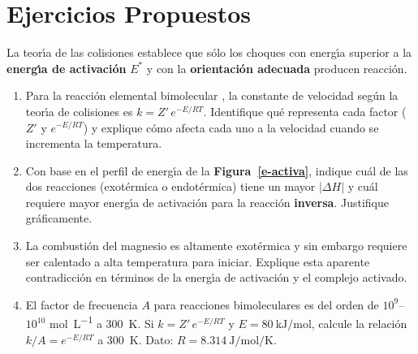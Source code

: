 
\section*{Ejercicios Propuestos}
\label{sec:ejercicios_cap03}

\begin{bloque_ejercicios}

\begin{ejercicios}

\item La teor\'{\i}a de las colisiones establece que s\'olo los choques
con energ\'{\i}a superior a la \textbf{energ\'{\i}a de activaci\'on} $E^*$ y
con la \textbf{orientaci\'on adecuada} producen reacci\'on.

\begin{enumerate}[label=\alph*)]
    \item Para la reacci\'on elemental bimolecular
          , la constante de velocidad
          seg\'un la teor\'{\i}a de colisiones es $k = Z'\,e^{-E/RT}$.
          Identifique qu\'e representa cada factor ($Z'$ y $e^{-E/RT}$)
          y explique c\'omo afecta cada uno a la velocidad cuando se
          incrementa la temperatura.

    \item Con base en el perfil de energ\'{\i}a de la
          \textbf{Figura~\ref{e-activa}}, indique cu\'al de las
          dos reacciones (exot\'ermica o endot\'ermica) tiene un
          mayor $|\Delta H|$ y cu\'al requiere mayor energ\'{\i}a de
          activaci\'on para la reacci\'on \textbf{inversa}.
          Justifique gr\'aficamente.

    \item La combusti\'on del magnesio es altamente exot\'ermica y
          sin embargo requiere ser calentado a alta temperatura para
          iniciar. Explique esta aparente contradicci\'on en t\'erminos
          de la energ\'{\i}a de activaci\'on y el complejo activado.

    \item El factor de frecuencia $A$ para reacciones bimoleculares
          es del orden de $10^9$--$10^{10}$ \si{\mole\per\liter} a
          \SI{300}{\kelvin}. Si $k = Z'\,e^{-E/RT}$ y
          $E = \SI{80}{\kilo\joule\per\mole}$, calcule la relaci\'on
          $k/A = e^{-E/RT}$ a \SI{300}{\kelvin}.
          Dato: $R = \SI{8.314}{\joule\per\mole\per\kelvin}$.
\end{enumerate}


\end{ejercicios}
\end{bloque_ejercicios}
